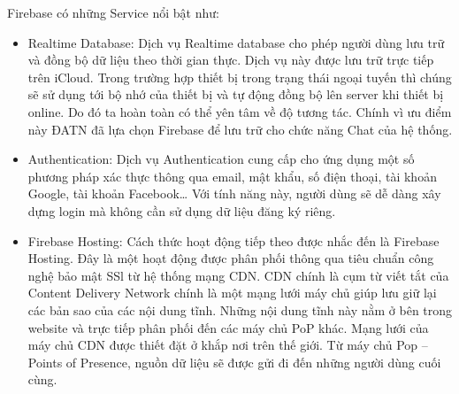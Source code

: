 \documentclass[../DoAn.tex]{subfiles}
\begin{document}
Firebase có những Service nổi bật như:
\begin{itemize}
    \item Realtime Database: Dịch vụ Realtime database cho phép người dùng lưu trữ và đồng bộ dữ liệu theo thời gian thực. Dịch vụ này được lưu trữ trực tiếp trên iCloud. Trong trường hợp thiết bị trong trạng thái ngoại tuyến thì chúng sẽ sử dụng tới bộ nhớ của thiết bị và tự động đồng bộ lên server khi thiết bị online. Do đó ta hoàn toàn có thể yên tâm về độ tương tác. Chính vì ưu điểm này ĐATN đã lựa chọn Firebase để lưu trữ cho chức năng Chat của hệ thống.
    \item Authentication: Dịch vụ Authentication cung cấp cho ứng dụng một số phương pháp xác thực thông qua email, mật khẩu, số điện thoại, tài khoản Google, tài khoản Facebook… Với tính năng này, người dùng sẽ dễ dàng xây dựng login mà không cần sử dụng dữ liệu đăng ký riêng.
    \item Firebase Hosting: Cách thức hoạt động tiếp theo được nhắc đến là Firebase Hosting. Đây là một hoạt động được phân phối thông qua tiêu chuẩn công nghệ bảo mật SSl từ hệ thống mạng CDN. CDN chính là cụm từ viết tắt của Content Delivery Network chính là một mạng lưới máy chủ giúp lưu giữ lại các bản sao của các nội dung tĩnh. Những nội dung tĩnh này nằm ở bên trong website và trực tiếp phân phối đến các máy chủ PoP khác. Mạng lưới của máy chủ CDN được thiết đặt ở khắp nơi trên thế giới. Từ máy chủ Pop – Points of Presence, nguồn dữ liệu sẽ được gửi đi đến những người dùng cuối cùng. 
\end{itemize}
\end{document}

